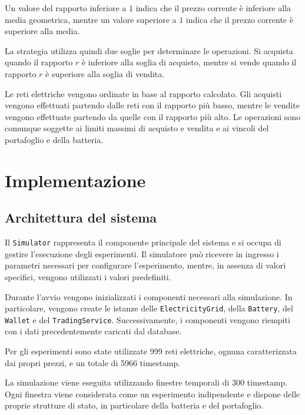 \documentclass[12pt,a4paper,oneside]{report}
\begin{document}
Un valore del rapporto inferiore a $1$ indica che il prezzo corrente è
inferiore alla media geometrica, mentre un valore superiore a $1$ indica che
il prezzo corrente è superiore alla media.

La strategia utilizza quindi due soglie per determinare le operazioni.
Si acquista quando il rapporto $r$ è inferiore alla soglia di acquisto,
mentre si vende quando il rapporto $r$ è superiore alla soglia di vendita.

Le reti elettriche vengono ordinate in base al rapporto calcolato. Gli acquisti
vengono effettuati partendo dalle reti con il rapporto più basso, mentre le
vendite vengono effettuate partendo da quelle con il rapporto più alto.
Le operazioni sono comunque soggette ai limiti massimi di acquisto e vendita
e ai vincoli del portafoglio e della batteria.



\chapter{Implementazione}

\label{chap:implementation}
\label{chap:results}

\section{Architettura del sistema}

Il \texttt{Simulator} rappresenta il componente principale del sistema e si
occupa di gestire l'esecuzione degli esperimenti. Il simulatore può ricevere
in ingresso i parametri necessari per configurare l'esperimento, mentre, in
assenza di valori specifici, vengono utilizzati i valori predefiniti.

Durante l'avvio vengono inizializzati i componenti necessari alla simulazione.
In particolare, vengono create le istanze delle \texttt{ElectricityGrid},
della \texttt{Battery}, del \texttt{Wallet} e del \texttt{TradingService}.
Successivamente, i componenti vengono riempiti con i dati precedentemente
caricati dal database.

Per gli esperimenti sono state utilizzate 999 reti elettriche, ognuna
caratterizzata dai propri prezzi, e un totale di 5966 timestamp.

La simulazione viene eseguita utilizzando finestre temporali di 300 timestamp.
Ogni finestra viene considerata come un esperimento indipendente e dispone
delle proprie strutture di stato, in particolare della batteria e del
portafoglio.
\end{document}
